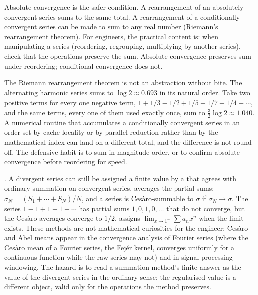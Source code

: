 Absolute convergence is the safer condition. A rearrangement of an
absolutely convergent series sums to the same total. A rearrangement
of a conditionally convergent series can be made to sum to any real
number (Riemann's rearrangement theorem). For engineers, the practical
content is: when manipulating a series (reordering, regrouping,
multiplying by another series), check that the operations preserve the
sum. Absolute convergence preserves sum under reordering; conditional
convergence does not.

The Riemann rearrangement theorem is not an abstraction without bite.
The alternating harmonic series sums to $\log 2 \approx 0.693$ in its
natural order. Take two positive terms for every one negative term,
$1 + 1/3 - 1/2 + 1/5 + 1/7 - 1/4 + \cdots$, and the same terms, every
one of them used exactly once, sum to $\tfrac{3}{2}\log 2 \approx
1.040$. A numerical routine that accumulates a conditionally convergent
series in an order set by cache locality or by parallel reduction rather
than by the mathematical index can land on a different total, and the
difference is not round-off. The defensive habit is to sum in magnitude
order, or to confirm absolute convergence before reordering for speed.

\begin{mastery}
. A divergent series can
still be assigned a finite value by a  that
agrees with ordinary summation on convergent series.  averages the partial sums: $\sigma_{N} = (S_{1} + \cdots +
S_{N})/N$, and a series is Ces\`{a}ro-summable to $\sigma$ if
$\sigma_{N} \to \sigma$. The series $1 - 1 + 1 - 1 + \cdots$ has
partial sums $1, 0, 1, 0, \ldots$ that do not converge, but the
Ces\`{a}ro averages converge to $1/2$.  assigns
$\lim_{x \to 1^{-}} \sum a_{n} x^{n}$ when the limit exists. These
methods are not mathematical curiosities for the engineer; Ces\`{a}ro
and Abel means appear in the convergence analysis of Fourier series
(where the Ces\`{a}ro mean of a Fourier series, the Fej\'{e}r kernel,
converges uniformly for a continuous function while the raw series may
not) and in signal-processing windowing. The hazard is to read a
summation method's finite answer as the value of the divergent series in
the ordinary sense; the regularised value is a different object, valid
only for the operations the method preserves.
\end{mastery}



